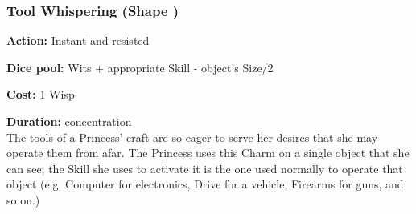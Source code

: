 \subsubsection*{Tool Whispering (Shape \textbullet\textbullet)}
\noindent \textbf{Action:} Instant and resisted

\noindent \textbf{Dice pool:} Wits + appropriate Skill - object’s Size/2

\noindent \textbf{Cost:} 1 Wisp

\noindent \textbf{Duration:} concentration \\

\noindent The tools of a Princess’ craft are so eager to serve her desires that she may operate them from afar. The Princess uses this Charm on a single object that she can see; the Skill she uses to activate it is the one used normally to operate that object (e.g. Computer for electronics, Drive for a vehicle, Firearms for guns, and so on.)

